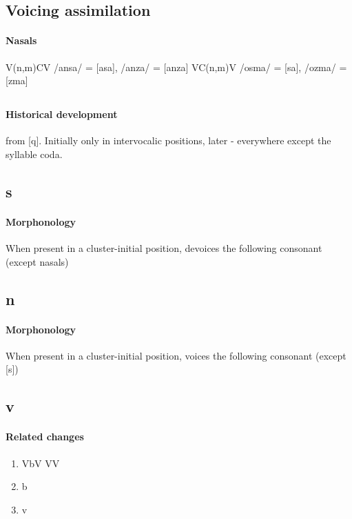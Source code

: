\documentclass[11pt]{article}
\begin{document}
\subsection{Voicing assimilation}

\paragraph{Nasals}

\begin{exe}
\ex V(n,m)CV \textrightarrow /ansa/ = [asa], /anza/ = [anza]
\ex VC(n,m)V \textrightarrow /osma/ = [\textopeno sa], /ozma/ = [\textopeno zma] 
\end{exe}

\subsection{}
\paragraph{Historical development} from [q]. Initially only in intervocalic positions, later - everywhere except the syllable coda.

\subsection{s}
\paragraph{Morphonology} When present in a cluster-initial position, devoices the following consonant (except nasals)

\subsection{n}
\paragraph{Morphonology} When present in a cluster-initial position, voices the following consonant (except [s])

\subsection{v}
\paragraph{Related changes}
\begin{enumerate}
\item VbV \textrightarrow VV
\item b \textrightarrow {}
\item {} \textrightarrow v
\end{enumerate}
\end{document}
